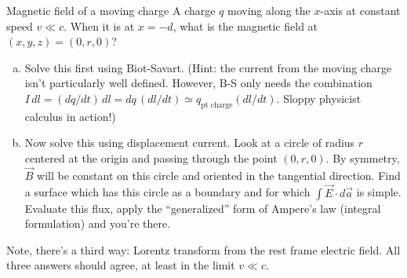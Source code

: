 \documentclass[makesolutionspdf]{esg8022pset}
\begin{document}
\begin{problem}{Magnetic field of a moving charge}
  A charge $q$ moving
  along the $x$-axis at constant speed $v \ll c$.  When it is at $x =
  -d$, what is the magnetic field at $(x,y,z) = (0,r,0)$?
  
  \begin{enumerate}[(a)]
    \item Solve this first using Biot-Savart.  (Hint:
      the current from the moving charge isn't particularly well defined.
      However, B-S only needs the combination $I\,dl = (dq/dt)\,dl = dq\,
      (dl/dt) \simeq q_{\text{pt charge}}(dl/dt)$.  Sloppy physicist calculus
      in action!)
    \item Now solve this using displacement current.
      Look at a circle of radius $r$ centered at the origin and passing
      through the point $(0,r,0)$.  By symmetry, $\vec B$ will be constant
      on this circle and oriented in the tangential direction.  Find a
      surface which has this circle as a boundary and for which $\int \vec
      E\cdot d\vec a$ is simple.  Evaluate this flux, apply the
      ``generalized'' form of Ampere's law (integral formulation) and you're
      there.
  \end{enumerate}
  
  \noindent Note, there's a third way: Lorentz transform from the
  rest frame electric field.  All
  three answers should agree, at least in the limit $v \ll c$.
\end{problem}
\end{document}
